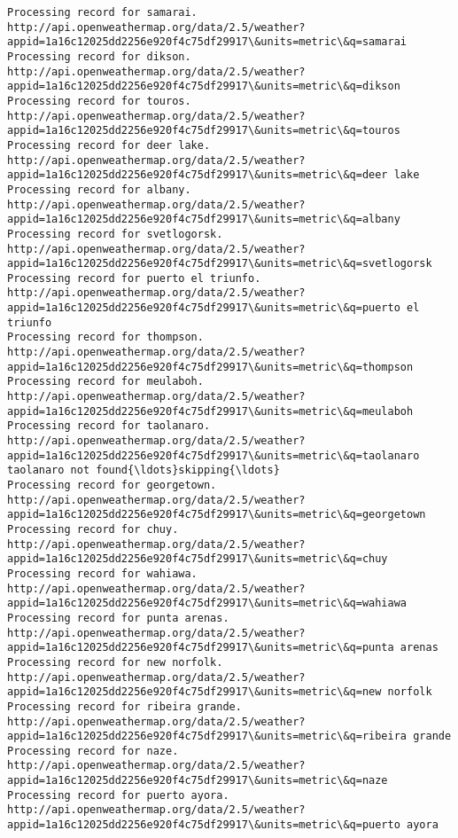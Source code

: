 \documentclass[11pt]{article}
\begin{document}
\begin{Verbatim}[commandchars=\\\{\}]
Processing record for samarai.
http://api.openweathermap.org/data/2.5/weather?appid=1a16c12025dd2256e920f4c75df29917\&units=metric\&q=samarai
Processing record for dikson.
http://api.openweathermap.org/data/2.5/weather?appid=1a16c12025dd2256e920f4c75df29917\&units=metric\&q=dikson
Processing record for touros.
http://api.openweathermap.org/data/2.5/weather?appid=1a16c12025dd2256e920f4c75df29917\&units=metric\&q=touros
Processing record for deer lake.
http://api.openweathermap.org/data/2.5/weather?appid=1a16c12025dd2256e920f4c75df29917\&units=metric\&q=deer lake
Processing record for albany.
http://api.openweathermap.org/data/2.5/weather?appid=1a16c12025dd2256e920f4c75df29917\&units=metric\&q=albany
Processing record for svetlogorsk.
http://api.openweathermap.org/data/2.5/weather?appid=1a16c12025dd2256e920f4c75df29917\&units=metric\&q=svetlogorsk
Processing record for puerto el triunfo.
http://api.openweathermap.org/data/2.5/weather?appid=1a16c12025dd2256e920f4c75df29917\&units=metric\&q=puerto el triunfo
Processing record for thompson.
http://api.openweathermap.org/data/2.5/weather?appid=1a16c12025dd2256e920f4c75df29917\&units=metric\&q=thompson
Processing record for meulaboh.
http://api.openweathermap.org/data/2.5/weather?appid=1a16c12025dd2256e920f4c75df29917\&units=metric\&q=meulaboh
Processing record for taolanaro.
http://api.openweathermap.org/data/2.5/weather?appid=1a16c12025dd2256e920f4c75df29917\&units=metric\&q=taolanaro
taolanaro not found{\ldots}skipping{\ldots}
Processing record for georgetown.
http://api.openweathermap.org/data/2.5/weather?appid=1a16c12025dd2256e920f4c75df29917\&units=metric\&q=georgetown
Processing record for chuy.
http://api.openweathermap.org/data/2.5/weather?appid=1a16c12025dd2256e920f4c75df29917\&units=metric\&q=chuy
Processing record for wahiawa.
http://api.openweathermap.org/data/2.5/weather?appid=1a16c12025dd2256e920f4c75df29917\&units=metric\&q=wahiawa
Processing record for punta arenas.
http://api.openweathermap.org/data/2.5/weather?appid=1a16c12025dd2256e920f4c75df29917\&units=metric\&q=punta arenas
Processing record for new norfolk.
http://api.openweathermap.org/data/2.5/weather?appid=1a16c12025dd2256e920f4c75df29917\&units=metric\&q=new norfolk
Processing record for ribeira grande.
http://api.openweathermap.org/data/2.5/weather?appid=1a16c12025dd2256e920f4c75df29917\&units=metric\&q=ribeira grande
Processing record for naze.
http://api.openweathermap.org/data/2.5/weather?appid=1a16c12025dd2256e920f4c75df29917\&units=metric\&q=naze
Processing record for puerto ayora.
http://api.openweathermap.org/data/2.5/weather?appid=1a16c12025dd2256e920f4c75df29917\&units=metric\&q=puerto ayora

\end{Verbatim}
\end{document}
